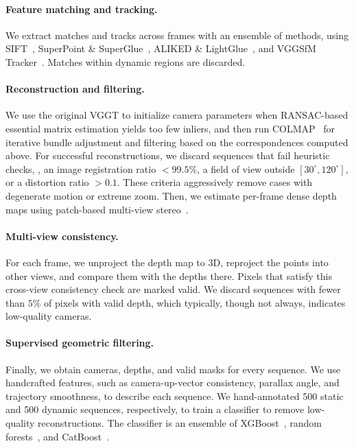 \paragraph{Feature matching and tracking.}

We extract matches and tracks across frames with an ensemble of methods, using
SIFT~\cite{lowe99object},
SuperPoint \& SuperGlue~\cite{daniel18superpoint:, sarlin20superglue:},
ALIKED \& LightGlue~\cite{zhao23aliked:, lindenberger23lightglue:}, and
VGGSfM Tracker~\cite{wang24vggsfm:}.
Matches within dynamic regions are discarded.

\paragraph{Reconstruction and filtering.}

We use the original VGGT to initialize camera parameters when RANSAC-based essential matrix estimation yields too few inliers, and then run COLMAP~\cite{schonberger16structure-from-motion} for iterative bundle adjustment and filtering based on the correspondences computed above.
For successful reconstructions, we discard sequences that fail heuristic checks, \eg, an image registration ratio $<99.5\%$, a field of view outside $[30^\circ,120^\circ]$, or a distortion ratio $>0.1$.
These criteria aggressively remove cases with degenerate motion or extreme zoom.
Then, we estimate per-frame dense depth maps using patch-based multi-view stereo~\cite{schonberger16pixelwise}.

\paragraph{Multi-view consistency.}

For each frame, we unproject the depth map to 3D, reproject the points into other views, and compare them with the depths there.
Pixels that satisfy this cross-view consistency check are marked valid.
We discard sequences with fewer than $5\%$ of pixels with valid depth, which typically, though not always, indicates low-quality cameras.

\paragraph{Supervised geometric filtering.}

Finally, we obtain cameras, depths, and valid masks for every sequence.
We use handcrafted features, such as camera-up-vector consistency, parallax angle, and trajectory smoothness, to describe each sequence.
We hand-annotated 500 static and 500 dynamic sequences, respectively, to train a classifier to remove low-quality reconstructions.
The classifier is an ensemble of XGBoost~\cite{chen16xgboost:}, random forests~\cite{breiman01random}, and CatBoost~\cite{prokhorenkova18catboost:}.

